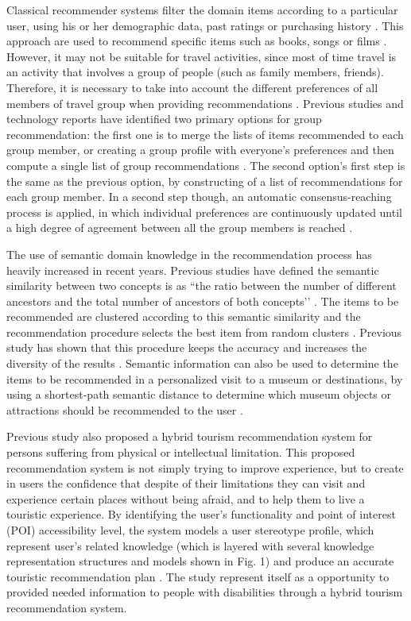 Classical recommender systems filter the domain items according to a particular user, using his or her demographic data, past ratings or purchasing history \cite{LU201512}. This approach are used to recommend specific items such as books, songs or films \cite{LU201512}. However, it may not be suitable for travel activities, since most of time travel is an activity that involves a group of people (such as family members, friends). Therefore, it is necessary to take into account the different preferences of all members of travel group when providing recommendations \cite{morenorecommender}. Previous studies and technology reports have identified two primary options for group recommendation: the first one is to merge the lists of items recommended to each group member, or creating a group profile with everyone’s preferences and then compute a single list of group recommendations \cite{Garcia2009}. The second option’s first step is the same as the previous option, by constructing of a list of recommendations for each group member. In a second step though, an automatic consensus-reaching process is applied, in which individual preferences are continuously updated until a high degree of agreement between all the group members is reached \cite{Garcia2009}.

The use of semantic domain knowledge in the recommendation process has heavily increased in recent years. Previous studies have defined the semantic similarity between two concepts is as ``the ratio between the number of different ancestors and the total number of ancestors of both concepts’’ \cite{morenorecommender}. The items to be recommended are clustered according to this semantic similarity and the recommendation procedure selects the best item from random clusters \cite{Santos2018}. Previous study has shown that this procedure keeps the accuracy and increases the diversity of the results \cite{morenorecommender}. Semantic information can also be used to determine the items to be recommended in a personalized visit to a museum or destinations, by using a shortest-path semantic distance to determine which museum objects or attractions should be recommended to the user \cite{morenorecommender}. 

Previous study also proposed a hybrid tourism recommendation system for persons suffering from physical or intellectual limitation. This proposed recommendation system is not simply trying to improve experience, but to create in users the confidence that despite of their limitations they can visit and experience certain places without being afraid, and to help them to live a touristic experience. By identifying the user’s functionality and point of interest (POI) accessibility level, the system models a user stereotype profile, which represent user’s related knowledge (which is layered with several knowledge representation structures and models shown in Fig. 1) and produce an accurate touristic recommendation plan \cite{Santos2018}. The study represent itself as a opportunity to provided needed information to people with disabilities through a hybrid tourism recommendation system. 



